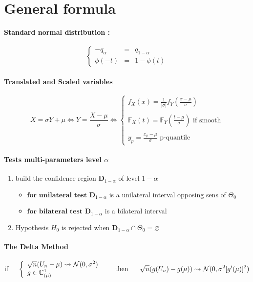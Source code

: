 \documentclass[a4paper,10pt]{article}
\begin{document}
\section{General formula}
\paragraph{Standard normal distribution :} 
\[
\left\{
\begin{array}{rcl}
-q_{\alpha} &=& q_{1-\alpha}   \\
\phi(-t)    &=& 1 - \phi(t)
\end{array}\right.
\]
\paragraph{Translated and Scaled variables}
\[
X=\sigma Y+\mu 
\Longleftrightarrow
Y=\frac{X-\mu}{\sigma}
\Longleftrightarrow
\left\{
\begin{array}{l}
f_{X}(x) = \frac{1}{|\sigma|} f_{Y}(\frac{x-\mu}{\sigma}) \\ \\
\mathbb{F}_{X}(t) = \mathbb{F}_{Y}(\frac{t-\mu}{\sigma}) \text{ if smooth} \\ \\
y_{p} =  \frac{x_{p}-\mu}{\sigma} \text{ p-quantile}
\end{array}\right.
\]


\paragraph{Tests multi-parameters level $\alpha$} 
\begin{enumerate}
 \item build the confidence region $\textbf{D}_{1-\alpha}$ of level $1-\alpha$ 
 \begin{itemize}
 \item $\textbf{for unilateral test}$ $\textbf{D}_{1-\alpha}$ is a unilateral interval opposing sens of $\Theta_0$ 
 \item $\textbf{for bilateral test}$ $\textbf{D}_{1-\alpha}$ is a bilateral interval
 \end{itemize}
 \item Hypothesis $H_0$ is rejected when $\textbf{D}_{1-\alpha} \cap \Theta_0 = \varnothing$
\end{enumerate}

\paragraph{The Delta Method}
\[
\text{if} \hspace{5mm} 
\left\{ 
\begin{array}{l}
\sqrt{n}(U_n - \mu) \rightsquigarrow   \mathcal{N}(0,\sigma^{2}) \\
g \in \mathbb{C}^1_{(\mu)}
\end{array}\right. 
\hspace{5mm} \text{ then  } \hspace{5mm}
\sqrt{n}(g(U_n) - g(\mu) ) \rightsquigarrow   \mathcal{N}(0,\sigma^{2}[g'(\mu)]^2) 
\]
\end{document}
